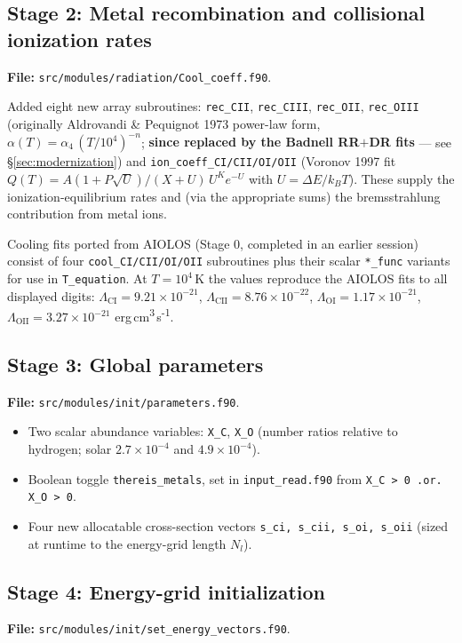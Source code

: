\documentclass[english,a4paper]{my_memo}
\begin{document}
\subsection{Stage 2: Metal recombination and collisional ionization rates}
\textbf{File:} \texttt{src/modules/radiation/Cool\_coeff.f90}.

Added eight new array subroutines:
\texttt{rec\_CII}, \texttt{rec\_CIII}, \texttt{rec\_OII},
\texttt{rec\_OIII} (originally Aldrovandi \& Pequignot 1973 power-law
form, \(\alpha(T) = \alpha_4\,(T/10^{4})^{-n}\); \textbf{since replaced
by the Badnell RR$+$DR fits} --- see
\S\ref{sec:modernization}) and
\texttt{ion\_coeff\_CI/CII/OI/OII} (Voronov 1997 fit
\(Q(T) = A(1+P\sqrt{U})/(X+U)\,U^{K}e^{-U}\) with
\(U = \Delta E/k_BT\)).  These supply the
ionization-equilibrium rates and (via the appropriate sums) the
bremsstrahlung contribution from metal ions.

Cooling fits ported from AIOLOS (Stage 0, completed in an earlier
session) consist of four \texttt{cool\_CI/CII/OI/OII} subroutines plus
their scalar \texttt{*\_func} variants for use in \texttt{T\_equation}.
At \(T = 10^{4}\)\,K the values reproduce the AIOLOS fits to all
displayed digits:
\(\Lambda_{\mathrm{CI}} = 9.21\times10^{-21}\),
\(\Lambda_{\mathrm{CII}} = 8.76\times10^{-22}\),
\(\Lambda_{\mathrm{OI}} = 1.17\times10^{-21}\),
\(\Lambda_{\mathrm{OII}} = 3.27\times10^{-21}\) erg\,cm\textsuperscript{3}\,s\textsuperscript{-1}.

\subsection{Stage 3: Global parameters}
\textbf{File:} \texttt{src/modules/init/parameters.f90}.

\begin{itemize}
  \item Two scalar abundance variables: \texttt{X\_C}, \texttt{X\_O}
    (number ratios relative to hydrogen; solar
    \(2.7\times10^{-4}\) and \(4.9\times10^{-4}\)).
  \item Boolean toggle \texttt{thereis\_metals}, set in
    \texttt{input\_read.f90} from
    \texttt{X\_C > 0 .or. X\_O > 0}.
  \item Four new allocatable cross-section vectors
    \texttt{s\_ci, s\_cii, s\_oi, s\_oii} (sized at runtime to the
    energy-grid length \(N_l\)).
\end{itemize}

\subsection{Stage 4: Energy-grid initialization}
\textbf{File:} \texttt{src/modules/init/set\_energy\_vectors.f90}.
\end{document}
